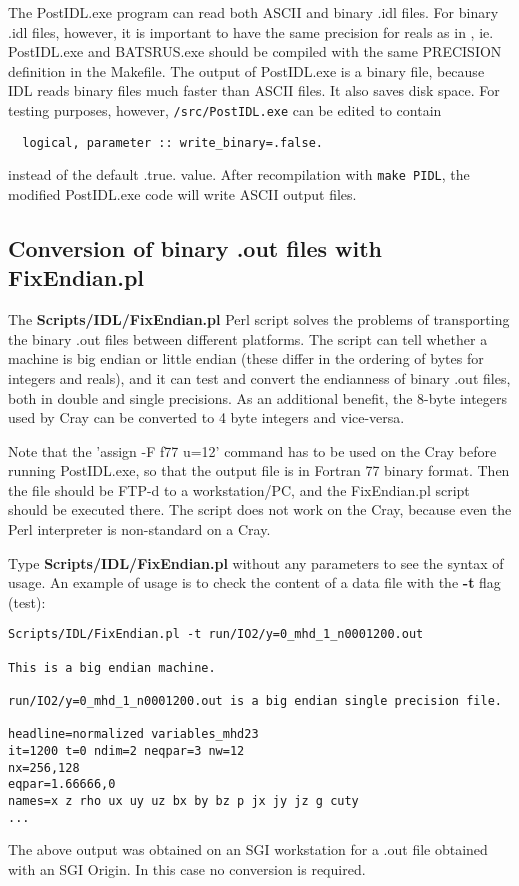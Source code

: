 The PostIDL.exe program can read both ASCII and binary .idl files. 
For binary .idl files, however, it is important to have the same
precision for reals as in \BATSRUS, ie. PostIDL.exe and BATSRUS.exe
should be compiled with the same PRECISION definition in the Makefile.
The output of PostIDL.exe is a binary file, because IDL reads
binary files much faster than ASCII files. It also saves disk space.
For testing purposes, however, {\tt /src/PostIDL.exe} can be edited to contain
\begin{verbatim}
  logical, parameter :: write_binary=.false.
\end{verbatim}
instead of the default .true. value. After recompilation with {\tt make PIDL},
the modified PostIDL.exe code will write ASCII output files. 

\subsection{Conversion of binary .out files with FixEndian.pl 
            \label{section:convert_bin}}

The {\bf Scripts/IDL/FixEndian.pl} Perl script solves the problems of 
transporting the binary .out files between different platforms.
The script can tell whether a machine is big endian or little
endian (these differ in the ordering of bytes for integers and reals),
and it can test and convert the endianness of binary .out files,
both in double and single precisions. As an additional benefit,
the 8-byte integers used by Cray can be converted to 4 byte integers
and vice-versa.

Note that the 'assign -F f77 u=12' command has to be used on the Cray 
before running PostIDL.exe, so that the output file is in Fortran 77 
binary format. Then the file should be FTP-d to a workstation/PC, and the 
FixEndian.pl script should be executed there. The script does not work on
the Cray, because even the Perl interpreter is non-standard on a Cray.

Type {\bf Scripts/IDL/FixEndian.pl} without any parameters to see the 
syntax of usage.
An example of usage is to check the content of a data file with the
{\bf -t} flag (test):
\begin{verbatim}
Scripts/IDL/FixEndian.pl -t run/IO2/y=0_mhd_1_n0001200.out

This is a big endian machine.

run/IO2/y=0_mhd_1_n0001200.out is a big endian single precision file.

headline=normalized variables_mhd23                                            
it=1200 t=0 ndim=2 neqpar=3 nw=12
nx=256,128
eqpar=1.66666,0
names=x z rho ux uy uz bx by bz p jx jy jz g cuty
...
\end{verbatim}
The above output was obtained on an SGI workstation for a .out file 
obtained with an SGI Origin. In this case no conversion is required.

